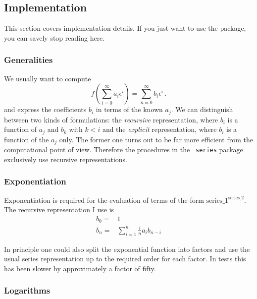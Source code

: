 \documentclass{article}
\begin{document}
\subsection{Implementation}
\label{sec:impl}

This section covers implementation details. If you just want to use the
package, you can savely stop reading here.

\subsubsection{Generalities}
\label{sec:impl_general}


 We usually want to compute
\begin{equation}
  \label{eq:def}
  f\left(\sum_{i=0}^{\infty}a_i \epsilon^i\right)=\sum_{n=0}^\infty b_i \epsilon^i\,.
\end{equation}
and express the coefficients $b_i$ in terms of the known $a_j$. We can
distinguish between two kinds of formulations: the {\it recursive} representation,
where $b_i$ is a function of $a_j$ and $b_k$ with $k < i$ and the {\it
  explicit} representation, where $b_i$ is a function of the $a_j$ only.
The former one turns out to be far more efficient from the
computational point of view. Therefore the procedures in the {\tt
  series} package exclusively use recursive representations.

\subsubsection{Exponentiation}
\label{sec:impl_exp}

Exponentiation is required for the evaluation of terms of the form
$\text{series\_1}^{\text{series\_2}}$.
The recursive representation I use is
\begin{align}
  \label{eq:exp_rec}
b_0=&1\\
b_n =&  \sum_{i=1}^{n} \frac{i}{n} a_{i}b_{n-i}
\end{align}

In principle one could also split the exponential function into factors
and use the usual series representation up to the required order for
each factor. In tests this has been slower by approximately a factor of fifty.

\subsubsection{Logarithms}
\label{sec:impl_log}
\end{document}
